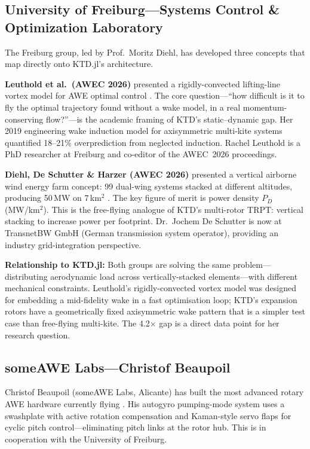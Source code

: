 \documentclass[11pt,a4paper]{article}
\begin{document}
\subsection{University of Freiburg---Systems Control \& Optimization Laboratory}

The Freiburg group, led by Prof.\ Moritz Diehl, has developed three concepts that map directly onto KTD.jl's architecture.

\textbf{Leuthold et al.\ (AWEC 2026)} presented a rigidly-convected lifting-line vortex model for AWE optimal control \cite{leuthold2026}.
The core question---``how difficult is it to fly the optimal trajectory found without a wake model, in a real momentum-conserving flow?''---is the academic framing of KTD's static--dynamic gap.
Her 2019 engineering wake induction model for axisymmetric multi-kite systems \cite{leuthold2019} quantified 18--21\% overprediction from neglected induction.
Rachel Leuthold is a PhD researcher at Freiburg and co-editor of the AWEC~2026 proceedings.

\textbf{Diehl, De Schutter \& Harzer (AWEC 2026)} presented a vertical airborne wind energy farm concept: 99 dual-wing systems stacked at different altitudes, producing 50\,MW on 7\,km$^2$ \cite{diehl2026}.
The key figure of merit is power density $P_D$ (MW/km$^2$).
This is the free-flying analogue of KTD's multi-rotor TRPT: vertical stacking to increase power per footprint.
Dr.\ Jochem De Schutter is now at TransnetBW GmbH (German transmission system operator), providing an industry grid-integration perspective.

\textbf{Relationship to KTD.jl:}
Both groups are solving the same problem---distributing aerodynamic load across vertically-stacked elements---with different mechanical constraints.
Leuthold's rigidly-convected vortex model was designed for embedding a mid-fidelity wake in a fast optimisation loop; KTD's expansion rotors have a geometrically fixed axisymmetric wake pattern that is a simpler test case than free-flying multi-kite.
The 4.2$\times$ gap is a direct data point for her research question.

\subsection{someAWE Labs---Christof Beaupoil}

Christof Beaupoil (someAWE Labs, Alicante) has built the most advanced rotary AWE hardware currently flying \cite{beaupoil2026}.
His autogyro pumping-mode system uses a swashplate with active rotation compensation and Kaman-style servo flaps for cyclic pitch control---eliminating pitch links at the rotor hub.
This is in cooperation with the University of Freiburg.
\end{document}
